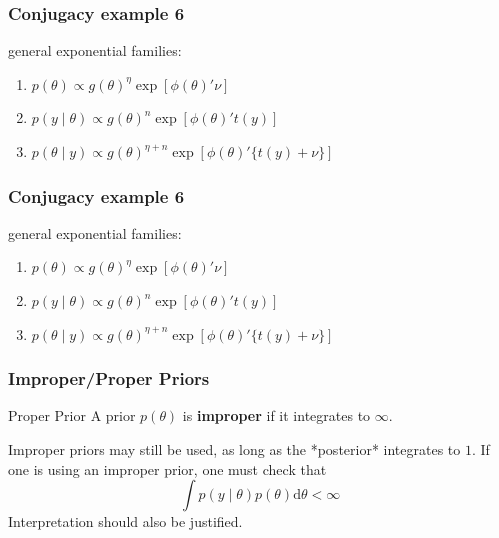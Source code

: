 \documentclass{beamer}
\begin{document}

\begin{frame}[fragile]
\frametitle{Conjugacy example 6}

general exponential families:
\begin{enumerate}
\item $p(\theta) \propto g(\theta)^{\eta} \exp\left[\phi(\theta)' \nu \right]$
\item $p(y \mid \theta) \propto g(\theta)^{n} \exp\left[\phi(\theta)' t(y) \right] $
\item $p(\theta \mid y) \propto g(\theta)^{\eta + n} \exp\left[\phi(\theta)' \{t(y) + \nu\} \right] $
\end{enumerate}


\end{frame}


\begin{frame}[fragile]
\frametitle{Conjugacy example 6}

general exponential families:
\begin{enumerate}
\item $p(\theta) \propto g(\theta)^{\eta} \exp\left[\phi(\theta)' \nu \right]$
\item $p(y \mid \theta) \propto g(\theta)^{n} \exp\left[\phi(\theta)' t(y) \right] $
\item $p(\theta \mid y) \propto g(\theta)^{\eta + n} \exp\left[\phi(\theta)' \{t(y) + \nu\} \right] $
\end{enumerate}


\end{frame}


\begin{frame}[fragile]
\frametitle{Improper/Proper Priors}

\begin{block}{Proper Prior}
A prior $p(\theta)$ is {\bf improper} if it integrates to $\infty$.
\end{block}

Improper priors may still be used, as long as the *posterior* integrates to $1$. If one is using an improper prior, one must check that 
\[
\int p(y \mid \theta) p(\theta) \text{d}\theta < \infty
\]
Interpretation should also be justified.


\end{frame}
\end{document}
